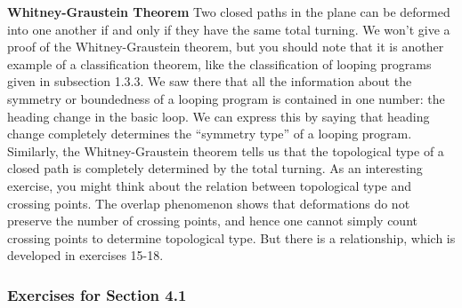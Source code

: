 \documentclass{book}
\begin{document}
\noindent \textbf{Whitney-Graustein Theorem} Two closed paths in the plane can be deformed
into one another if and only if they have the same total turning.
We won't give a proof of the Whitney-Graustein theorem, but you
should note that it is another example of a classification theorem, like the
classification of looping programs given in subsection 1.3.3. We saw there
that all the information about the symmetry or boundedness of a looping
program is contained in one number: the heading change in the basic
loop. We can express this by saying that heading change completely
determines the ``symmetry type'' of a looping program. Similarly, the
Whitney-Graustein theorem tells us that the topological type of a closed
path is completely determined by the total turning. As an interesting
exercise, you might think about the relation between topological type
and crossing points. The overlap phenomenon shows that deformations
do not preserve the number of crossing points, and hence one cannot
simply count crossing points to determine topological type. But there is
a relationship, which is developed in exercises 15-18.

\subsubsection{Exercises for Section 4.1}
\end{document}
